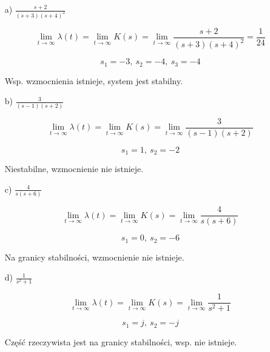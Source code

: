 \documentclass{article}
\begin{document}
\begin{itemize}
    \item[a)] $\frac{s+2}{(s+3)(s+4)^{2}}$
     
        $$\lim\limits_{t \to \infty} \lambda(t)=\lim\limits_{t \to \infty} K(s)=
        \lim\limits_{t \to \infty} \frac{s+2}{(s+3)(s+4)^{2}}=\frac{1}{24}$$

        $$ s_{1}=-3, \ s_{2}=-4, \ s_{3}=-4 $$

        Wsp. wzmocnienia istnieje, system jest stabilny.

    \item[b)] $\frac{3}{(s-1)(s+2)}$
    
        $$\lim\limits_{t \to \infty} \lambda(t)=\lim\limits_{t \to \infty} K(s)=
        \lim\limits_{t \to \infty} \frac{3}{(s-1)(s+2)}$$

        $$ s_{1}=1, \ s_{2}=-2$$
        
        Niestabilne, wzmocnienie nie istnieje.

    \item[c)] $ \frac{4}{s(s+6)} $
    
        $$\lim\limits_{t \to \infty} \lambda(t)=\lim\limits_{t \to \infty} K(s)=
        \lim\limits_{t \to \infty} \frac{4}{s(s+6)}$$

        $$ s_{1}=0, \ s_{2}=-6 $$

        Na granicy stabilności, wzmocnienie nie istnieje.

    \item[d)] $\frac{1}{s^{2}+1}$  

        $$\lim\limits_{t \to \infty} \lambda(t)=\lim\limits_{t \to \infty} K(s)=
        \lim\limits_{t \to \infty} \frac{1}{s^{2}+1}$$

        $$ s_{1}=j, \ s_{2}=-j $$

        Część rzeczywista jest na granicy stabilności, wsp. nie istnieje.

    \end{itemize}
\end{document}
